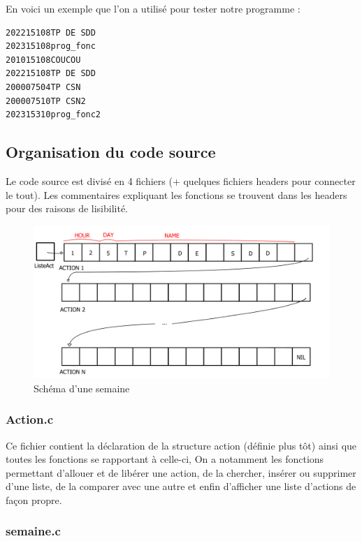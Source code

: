 \documentclass[11pt]{article}
\begin{document}
En voici un exemple que l'on a utilisé pour tester notre programme :

\begin{verbatim}
202215108TP DE SDD
202315108prog_fonc
201015108COUCOU
202215108TP DE SDD
200007504TP CSN
200007510TP CSN2
202315310prog_fonc2
\end{verbatim}


\subsection{Organisation du code source}
\label{sec:org383da39}

Le code source est divisé en 4 fichiers (+ quelques fichiers headers pour connecter le tout). Les commentaires expliquant les fonctions se trouvent dans les headers pour des raisons de lisibilité.

\begin{figure}[htbp]
\centering
\includegraphics[width=.9\linewidth]{./sem.jpg}
\caption{\label{fig:org4cee2cc}Schéma d'une semaine}
\end{figure}

\subsubsection{Action.c}
\label{sec:orge407d73}

Ce fichier contient la déclaration de la structure action (définie plus tôt)
ainsi que toutes les fonctions se rapportant à celle-ci, On a notamment les
fonctions permettant d'allouer et de libérer une action, de la chercher, insérer
ou supprimer d'une liste, de la comparer avec une autre et enfin d'afficher
une liste d'actions de façon propre.


\subsubsection{semaine.c}
\label{sec:orgbc14bef}
\end{document}
